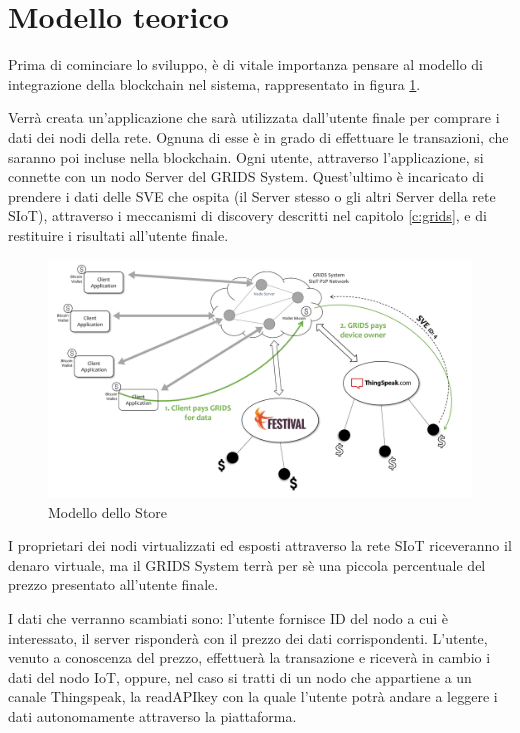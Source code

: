 \section{Modello teorico}
\label{c:integr:model}

Prima di cominciare lo sviluppo, è di vitale importanza pensare al modello di integrazione della blockchain nel sistema, rappresentato in figura \ref{f:integr:modellone}. 

Verrà creata un'applicazione che sarà utilizzata dall'utente finale per comprare i dati dei nodi della rete. 
Ognuna di esse è in grado di effettuare le transazioni, che saranno poi incluse nella blockchain. Ogni utente, attraverso l'applicazione, si connette con un nodo Server del GRIDS System. Quest'ultimo è incaricato di prendere i dati delle SVE che ospita (il Server stesso o gli altri Server della rete SIoT), attraverso i meccanismi di discovery descritti nel capitolo \ref{c:grids}, e di restituire i risultati all'utente finale. 

\begin{figure}[h!t]
\centerline{\includegraphics[width=\textwidth]{img/modellone}}
\caption{Modello dello Store}
\label{f:integr:modellone}
\end{figure}

I proprietari dei nodi virtualizzati ed esposti attraverso la rete SIoT riceveranno il denaro virtuale, ma il GRIDS System terrà per sè una piccola percentuale del prezzo presentato all'utente finale.

I dati che verranno scambiati sono: l'utente fornisce ID del nodo a cui è interessato, il server risponderà con il prezzo dei dati corrispondenti. L'utente, venuto a conoscenza del prezzo, effettuerà la transazione e riceverà in cambio i dati del nodo IoT, oppure, nel caso si tratti di un nodo che appartiene a un canale Thingspeak, la readAPIkey con la quale l'utente potrà andare a leggere i dati autonomamente attraverso la piattaforma.

